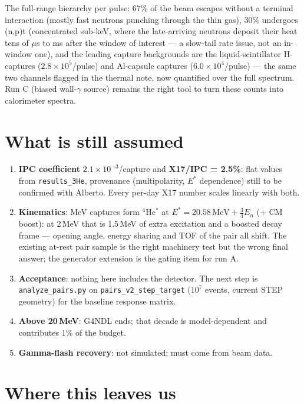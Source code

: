 \documentclass[11pt,a4paper]{article}
\newcommand{\He}[1]{$^{#1}$He}
\begin{document}
\noindent The full-range hierarchy per pulse: 67\% of the beam escapes
without a terminal interaction (mostly fast neutrons punching through the
thin gas), 30\% undergoes (n,p)t (concentrated sub-keV, where the
late-arriving neutrons deposit their heat tens of $\mu$s to ms after the
window of interest --- a slow-tail rate issue, not an in-window one), and
the leading capture backgrounds are the liquid-scintillator H-captures
($2.8\times10^{5}$/pulse) and Al-capsule captures ($6.0\times10^{4}$/pulse)
--- the same two channels flagged in the thermal note, now quantified over
the full spectrum. Run C (biased wall-$\gamma$ source) remains the right
tool to turn these counts into calorimeter spectra.

\section{What is still assumed}

\begin{enumerate}
  \item \textbf{IPC coefficient} $2.1\times10^{-3}$/capture and
    \textbf{X17/IPC = 2.5\%}: flat values from \texttt{results\_3He},
    provenance (multipolarity, $E^{*}$ dependence) still to be confirmed
    with Alberto. Every per-day X17 number scales linearly with both.
  \item \textbf{Kinematics}: MeV captures form \He{4}$^{*}$ at
    $E^{*} = 20.58\,\text{MeV} + \tfrac{3}{4}E_n$ (+ CM boost): at 2\,MeV
    that is 1.5\,MeV of extra excitation and a boosted decay frame ---
    opening angle, energy sharing and TOF of the pair all shift. The
    existing at-rest pair sample is the right machinery test but the wrong
    final answer; the generator extension is the gating item for run A.
  \item \textbf{Acceptance}: nothing here includes the detector. The next
    step is \texttt{analyze\_pairs.py} on \texttt{pairs\_v2\_step\_target}
    ($10^{7}$ events, current STEP geometry) for the baseline response
    matrix.
  \item \textbf{Above 20\,MeV}: G4NDL ends; that decade is model-dependent
    and contributes 1\% of the budget.
  \item \textbf{Gamma-flash recovery}: not simulated; must come from beam
    data.
\end{enumerate}

\section{Where this leaves us}
\end{document}
